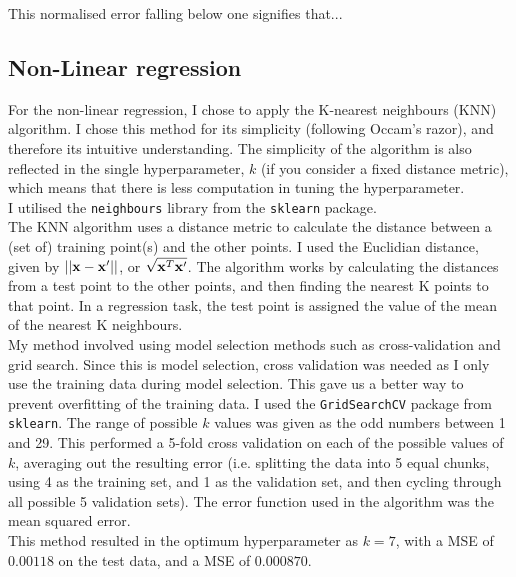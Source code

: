 \documentclass{scrartcl}
\begin{document}
This normalised error falling below one signifies that...

\subsection{Non-Linear regression}

For the non-linear regression, I chose to apply the K-nearest neighbours (KNN) algorithm. I chose this method for its simplicity (following Occam's razor), and therefore its intuitive understanding. The simplicity of the algorithm is also reflected in the single hyperparameter, $k$ (if you consider a fixed distance metric), which means that there is less computation in tuning the hyperparameter. \\

I utilised the \texttt{neighbours} library from the \texttt{sklearn} package. \\

The KNN algorithm uses a distance metric to calculate the distance between a (set of) training point(s) and the other points. I used the Euclidian distance, given by $ || {\mathbf x} - {\mathbf x}' || $, or $ \sqrt {{\mathbf x}^T {\mathbf x}' } $. The algorithm works by calculating the distances from a test point to the other points, and then finding the nearest K points to that point. In a regression task, the test point is assigned the value of the mean of the nearest K neighbours. \\

My method involved using model selection methods such as cross-validation and grid search. Since this is model selection, cross validation was needed as I only use the training data during model selection. This gave us a better way to prevent overfitting of the training data. I used the \texttt{GridSearchCV} package from \texttt{sklearn}. The range of possible $k$ values was given as the odd numbers between 1 and 29. This performed a 5-fold cross validation on each of the possible values of $k$, averaging out the resulting error (i.e. splitting the data into 5 equal chunks, using 4 as the training set, and 1 as the validation set, and then cycling through all possible 5 validation sets). The error function used in the algorithm was the mean squared error.\\

This method resulted in the optimum hyperparameter as $k = 7$, with a MSE of $0.00118$ on the test data, and a MSE of $0.000870$. \\
\end{document}
